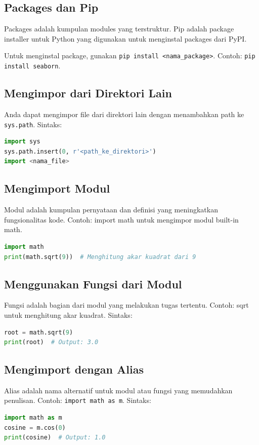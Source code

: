 \documentclass{article}
\begin{document}
\subsection{Packages dan Pip}
Packages adalah kumpulan modules yang terstruktur. Pip adalah package installer untuk Python yang digunakan untuk menginstal packages dari PyPI.

Untuk menginstal package, gunakan \verb|pip install <nama_package>|. Contoh: \verb|pip install seaborn|.

\subsection{Mengimpor dari Direktori Lain}
Anda dapat mengimpor file dari direktori lain dengan menambahkan path ke \verb|sys.path|.
Sintaks:
\begin{lstlisting}[language=Python, caption={}, captionpos=b]
import sys
sys.path.insert(0, r'<path_ke_direktori>')
import <nama_file>
\end{lstlisting}

\subsection{Mengimport Modul}
Modul adalah kumpulan pernyataan dan definisi yang meningkatkan fungsionalitas kode. Contoh: import math untuk mengimpor modul built-in math.
\begin{lstlisting}[language=Python, caption={}, captionpos=b]
import math
print(math.sqrt(9))  # Menghitung akar kuadrat dari 9
\end{lstlisting}

\subsection{Menggunakan Fungsi dari Modul}
Fungsi adalah bagian dari modul yang melakukan tugas tertentu. Contoh: sqrt untuk menghitung akar kuadrat.
Sintaks:
\begin{lstlisting}[language=Python, caption={}, captionpos=b]
root = math.sqrt(9)
print(root)  # Output: 3.0
\end{lstlisting}

\subsection{Mengimport dengan Alias}
Alias adalah nama alternatif untuk modul atau fungsi yang memudahkan penulisan. Contoh: \verb|import math as m|.
Sintaks:
\begin{lstlisting}[language=Python, caption={}, captionpos=b]
import math as m
cosine = m.cos(0)
print(cosine)  # Output: 1.0
\end{lstlisting}
\end{document}

